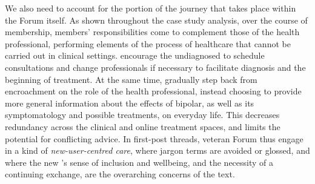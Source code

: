 We also need to account for the portion of the journey that takes place within the \gls{Forum} itself. As shown throughout the case study analysis, over the course of membership, \glspl{member}' responsibilities come to complement those of the health professional, performing elements of the process of healthcare that cannot be carried out in clinical settings.  encourage the undiagnosed to schedule consultations and change professionals if necessary to facilitate diagnosis and the beginning of treatment. At the same time,  gradually step back from encroachment on the role of the health professional, instead choosing to provide more general information about the effects of \gls{bipolar}, as well as its symptomatology and possible treatments, on everyday life. This decreases redundancy across the clinical and online treatment spaces, and limits the potential for conflicting advice. In first\hyp{}\gls{post} \glspl{thread}, veteran \gls{Forum}  thus engage in a kind of \emph{new\hyp{}user\hyp{}centred care}, where jargon terms are avoided or glossed, and where the new 's sense of inclusion and wellbeing, and the necessity of a continuing exchange, are the overarching concerns of the text. 




